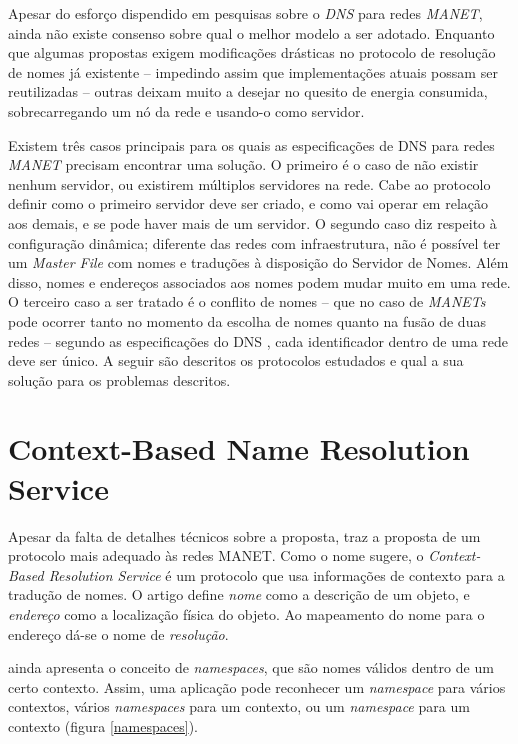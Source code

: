 
Apesar do esforço dispendido em pesquisas sobre o \textit{DNS} para redes 
\textit{MANET}, ainda não existe consenso sobre qual o melhor modelo a ser 
adotado. Enquanto que algumas propostas exigem modificações drásticas no 
protocolo de resolução de nomes já existente -- impedindo assim que 
implementações atuais possam ser reutilizadas -- outras deixam muito a desejar 
no quesito de energia consumida, sobrecarregando um nó da rede e usando-o como
 servidor.

Existem três casos principais para os quais as especificações de DNS para redes 
\textit{MANET} precisam encontrar uma solução. O primeiro é o caso de não existir 
nenhum servidor, ou existirem múltiplos servidores na rede. Cabe ao protocolo 
definir como o primeiro servidor deve ser criado, e como vai operar em relação 
aos demais, e se pode haver mais de um servidor. O segundo caso diz respeito à 
configuração dinâmica; diferente das redes com infraestrutura, não é possível 
ter um \textit{Master File} com nomes e traduções à disposição do Servidor de 
Nomes. Além disso, nomes e endereços associados aos nomes podem mudar muito em 
uma rede. O terceiro caso a ser tratado é o conflito de nomes -- que no caso de 
\textit{MANETs} pode ocorrer tanto no momento da escolha de nomes quanto na fusão
 de duas redes -- segundo as especificações do DNS \cite{rfc1035}, cada 
 identificador dentro de uma rede deve ser único. A seguir são descritos os 
 protocolos estudados e qual a sua solução para os problemas descritos.

\section{Context-Based Name Resolution Service}
\label{context-based}

    Apesar da falta de detalhes técnicos sobre a proposta, \cite{context-dns}
    traz a proposta de um protocolo mais adequado às redes MANET. Como o nome
    sugere, o \textit{Context-Based Resolution Service} é um protocolo que usa
    informações de contexto para a tradução de nomes. O artigo define \emph{nome}
    como a descrição de um objeto, e \emph{endereço} como a localização física do
    objeto. Ao mapeamento do nome para o endereço dá-se o nome de \emph{resolução}.
    
    \cite{context-dns} ainda apresenta o conceito de \textit{namespaces}, que são
    nomes válidos dentro de um certo contexto. Assim, uma aplicação pode reconhecer
    um \textit{namespace} para vários contextos, vários \textit{namespaces} para
    um contexto, ou um \textit{namespace} para um contexto (figura \ref{namespaces}).
    
